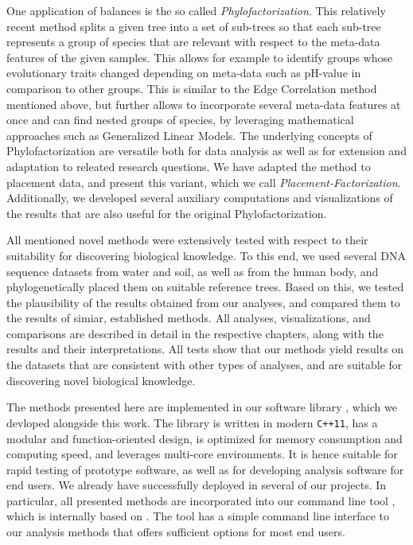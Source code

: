 One application of balances is the so called \emph{Phylofactorization}.
This relatively recent method splits a given tree into a set of sub-trees
so that each sub-tree represents a group of species that are relevant with respect to the meta-data features
of the given samples.
This allows for example to identify groups whose evolutionary traits changed depending on meta-data such as pH-value
in comparison to other groups.
This is similar to the Edge Correlation method mentioned above,
but further allows to incorporate several meta-data features at once and can find nested groups of species,
by leveraging mathematical approaches such as Generalized Linear Models.
The underlying concepts of Phylofactorization are versatile both for data analysis
as well as for extension and adaptation to releated research questions.
We have adapted the method to placement data, and present this variant, which we call \emph{Placement-Factorization}.
Additionally, we developed several auxiliary computations and visualizations of the results
that are also useful for the original Phylofactorization.

All mentioned novel methods were extensively tested with respect to their suitability for discovering biological knowledge.
To this end, we used several DNA sequence datasets from water and soil, as well as from the human body,
and phylogenetically placed them on suitable reference trees.
Based on this, we tested the plausibility of the results obtained from our analyses,
and compared them to the results of simiar, established methods.
All analyses, visualizations, and comparisons are described in detail in the respective chapters,
along with the results and their interpretations.
All tests show that our methods yield results on the datasets that are consistent with other types of analyses,
and are suitable for discovering novel biological knowledge.

The methods presented here are implemented in our software library ,
which we devloped alongside this work.
The library is written in modern \texttt{C++11}, has a modular and function-oriented design,
is optimized for memory consumption and computing speed, and leverages multi-core environments.
It is hence suitable for rapid testing of prototype software, as well as for developing analysis software for end users.
We already have successfully deployed  in several of our projects.
In particular, all presented methods are incorporated into our command line tool ,
which is internally based on .
The tool has a simple command line interface to our analysis methods that offers sufficient options for most end users.

